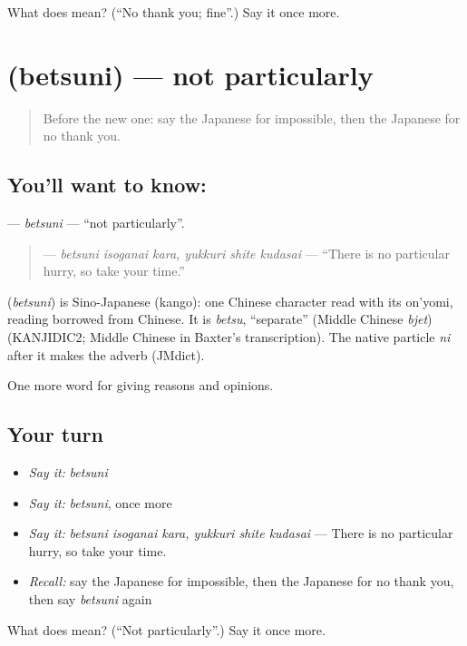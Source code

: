 \begin{tcolorbox}[breakable,colback=teal!4,colframe=teal!35!black,title={Before you move on}]
What does  mean? (\textquotedblleft{}No thank you; fine\textquotedblright{}.) Say it once more.
\end{tcolorbox}
\section[\texorpdfstring{\ja{べつに} (betsuni)}{べつに (betsuni)}]{ (betsuni) — not particularly}

\label{lesson:JA-C323-betsuni}



\begin{quote}
Before the new one: say the Japanese for impossible, then the Japanese for no thank you.
\end{quote}

\subsection*{You'll want to know: }
\textbf{} — \emph{betsuni} — \textquotedblleft{}not particularly\textquotedblright{}.

\begin{quote}
\textbf{   } — \emph{betsuni isoganai kara, yukkuri shite kudasai} — \textquotedblleft{}There is no particular hurry, so take your time.\textquotedblright{}
\end{quote}

\begin{cousinweb}
\textbf{} (\emph{betsuni}) is Sino-Japanese (kango): one Chinese character read with its on'yomi, reading borrowed from Chinese. It is \emph{betsu}, \textquotedblleft{}separate\textquotedblright{} (Middle Chinese \emph{bjet}) (KANJIDIC2; Middle Chinese in Baxter's transcription). The native particle \emph{ni} after it makes the adverb (JMdict).
\end{cousinweb}

\begin{grammarlens}[title={What you've built}]
One more word for giving reasons and opinions.
\end{grammarlens}

\subsection*{Your turn}
\begin{itemize}
\raggedright
  \item \emph{Say it:} \emph{betsuni}
  \item \emph{Say it:} \emph{betsuni}, once more
  \item \emph{Say it:} \emph{betsuni isoganai kara, yukkuri shite kudasai} — There is no particular hurry, so take your time.
  \item \emph{Recall:} say the Japanese for impossible, then the Japanese for no thank you, then say \emph{betsuni} again
\end{itemize}

\begin{tcolorbox}[breakable,colback=teal!4,colframe=teal!35!black,title={Before you move on}]
What does  mean? (\textquotedblleft{}Not particularly\textquotedblright{}.) Say it once more.
\end{tcolorbox}
